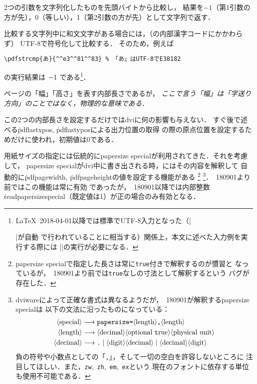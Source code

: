 \documentclass[a4paper,11pt,nomag]{jsarticle}
\begin{document}
\begin{cslist}
  2つの引数を文字列化したものを先頭バイトから比較し，
  結果を$-1$（第1引数の方が先），0（等しい），1（第2引数の方が先）として文字列で返す．
  
  比較する文字列中に和文文字がある場合には，（\epTeX の内部漢字コードにかかわらず）
  UTF-8で符号化して比較する．
  そのため，例えば
\begin{verbatim}
\pdfstrcmp{あ}{^^e3^^81^^83} % 「あ」はUTF-8でE38182
\end{verbatim}
  の実行結果は
    {\ifdefined\UseRawInputEncoding\UseRawInputEncoding\fi
    $\pdfstrcmp{あ}{^^e3^^81^^83}$}%
  である\footnote{%
    \LaTeX~2018-04-01以降では標準でUTF-8入力となった（|\usepackage[utf8]{inputenc}|が自動
    で行われていることに相当する）関係上，本文に述べた入力例を実行する際には
    |\UseRawInputEncoding|の実行が必要になる．
  }．

  ページの「幅」「高さ」を表す内部長さであるが，
  \emph{ここで言う「幅」は「字送り方向」のことではなく，物理的な意味である}．

  この2つの内部長さを設定するだけではdviに何の影響も与えない．
  すぐ後で述べる\.{pdflastxpos}, \.{pdflastypos}による出力位置の取得
  の際の原点位置を設定するためだけに使われ，初期値は0である．

  用紙サイズの指定には伝統的にpapersize specialが利用されてきた．それを考慮して，
  papersize specialがdvi中に書き出される時，\epTeX にはその内容を解釈して
  自動的に\.{pdfpagewidth}, \.{pdfpageheight}の値を設定する機能がある
  \footnote{%
  papersize specialで指定した長さは常に\texttt{true}付きで解釈するのが慣習と
  なっているが，\epTeX~180901より前では\texttt{true}なしの寸法として解釈するという
  バグが存在した．}%
  \footnote{%
  dviwareによって正確な書式は異なるようだが，\epTeX~180901が解釈するpapersize specialは
  以下の文法に沿ったものになっている：
\def\<#1>{\langle\mbox{#1}\rangle}
\begin{align*}
  \<special> &\longrightarrow \texttt{papersize=}\<length>\texttt{,}\<length>\\
  \<length>  &\longrightarrow \<decimal> 
    \<optional~\texttt{true}>\<physical unit>\\
  \<decimal> &\longrightarrow \texttt{.} \mid \<digit>\<decimal> \mid
    \<decimal>\<digit>
\end{align*}
  負の符号や小数点としての「\texttt{,}」，そして一切の空白を許容しないところに
  注目してほしい．また，\texttt{zw},~\texttt{zh},~\texttt{em},~\texttt{ex}という
  現在のフォントに依存する単位も使用不可能である．
  }．\epTeX~180901より前ではこの機能は常に有効
  であったが，\epTeX~180901以降では内部整数
  \.{readpapersizespecial}（既定値は1）が正の場合のみ有効となる．
 

\end{cslist}
\end{document}
